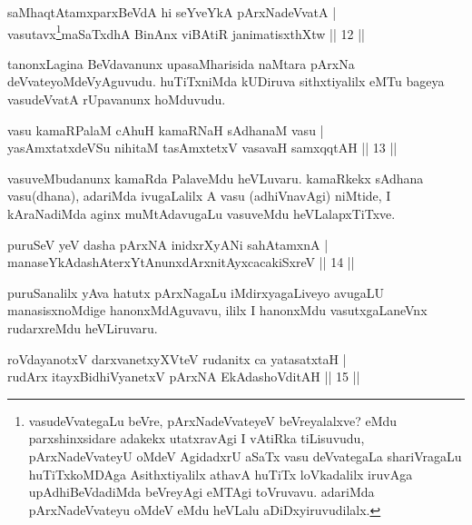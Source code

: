 \begin{shl}
saMhaqtAtamxparxBeVdA hi seYveYkA pArxNadeVvatA |\\
vasutavx\footnote{vasudeVvategaLu beVre, pArxNadeVvateyeV beVreyalalxve? eMdu parxshinxsidare adakekx utatxravAgi I vAtiRka tiLisuvudu, pArxNadeVvateyU oMdeV AgidadxrU aSaTx vasu deVvategaLa shariVragaLu huTiTxkoMDAga Asithxtiyalilx athavA huTiTx loVkadalilx iruvAga upAdhiBeVdadiMda beVreyAgi eMTAgi toVruvavu. adariMda pArxNadeVvateyu oMdeV eMdu heVLalu aDiDxyiruvudilalx.}maSaTxdhA BinAnx viBAtiR janimatisxthXtw \hfill || 12 ||
\end{shl}

\begin{artha}
tanonxLagina BeVdavanunx upasaMharisida naMtara pArxNa deVvateyoMdeVyAguvudu. huTiTxniMda kUDiruva sithxtiyalilx eMTu bageya vasudeVvatA rUpavanunx hoMduvudu.
\end{artha}


\begin{shl}
vasu kamaRPalaM cA\s \s huH kamaRNaH sAdhanaM vasu |\\
yasAmxtatxdeVSu nihitaM tasAmxtetxV vasavaH samxqqtAH \hfill || 13 ||
\end{shl}

\begin{artha}
vasuveMbudanunx kamaRda PalaveMdu heVLuvaru. kamaRkekx sAdhana vasu(dhana), adariMda ivugaLalilx A vasu (adhiVnavAgi) niMtide, I kAraNadiMda aginx muMtAdavugaLu vasuveMdu heVLalapxTiTxve.
\end{artha}


\begin{shl}
puruSeV yeV dasha pArxNA inidxrXyANi sahA\s \s tamxnA |\\
manaseYkAdashAterxYtAnunxdArxnitAyxcacakiSxreV \hfill || 14 ||
\end{shl}

\begin{artha}
puruSanalilx yAva hatutx pArxNagaLu iMdirxyagaLiveyo avugaLU manasisxnoMdige hanonxMdAguvavu, ililx I hanonxMdu vasutxgaLaneVnx rudarxreMdu heVLiruvaru.
\end{artha}


\begin{shl}
roVdayanotxV darxvanetxyXVteV rudanitx ca yatasatxtaH |\\
rudArx itayxBidhiVyanetxV pArxNA EkAdashoVditAH \hfill || 15 ||
\end{shl}

